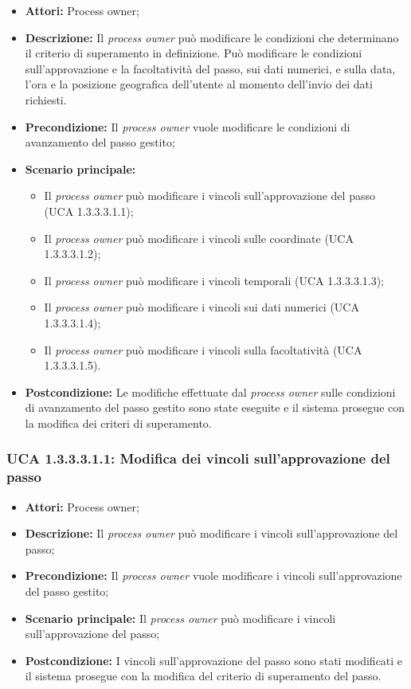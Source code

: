 \begin{itemize}
\item \textbf{Attori:} Process owner;
\item \textbf{Descrizione:}
Il \textit{process owner} può modificare le condizioni che determinano il criterio di superamento in definizione.
Può modificare le condizioni sull'approvazione e la facoltatività del passo, sui dati numerici, e sulla data, l'ora e la posizione geografica dell'utente al momento dell'invio dei dati richiesti.
\item \textbf{Precondizione:}
Il \textit{process owner} vuole modificare le condizioni di avanzamento del passo gestito;
\item \textbf{Scenario principale:}
\begin{itemize}
\item Il \textit{process owner} può modificare i vincoli sull'approvazione del passo (UCA 1.3.3.3.1.1);
\item Il \textit{process owner} può modificare i vincoli sulle coordinate (UCA 1.3.3.3.1.2);
\item Il \textit{process owner} può modificare i vincoli temporali (UCA 1.3.3.3.1.3);
\item Il \textit{process owner} può modificare i vincoli sui dati numerici (UCA 1.3.3.3.1.4);
\item Il \textit{process owner} può modificare i vincoli sulla facoltatività (UCA 1.3.3.3.1.5).
\end{itemize}
\item \textbf{Postcondizione:}
Le modifiche effettuate dal \textit{process owner} sulle condizioni di avanzamento del passo gestito sono state eseguite e il sistema prosegue con la modifica dei criteri di superamento.
\end{itemize}

\hypertarget{A1.3.3.3.1.1}{}
\subsubsection{UCA 1.3.3.3.1.1: Modifica dei vincoli sull'approvazione del passo}
\begin{itemize}
\item \textbf{Attori:} Process owner;
\item \textbf{Descrizione:}
Il \textit{process owner} può modificare i vincoli sull'approvazione del passo;
\item \textbf{Precondizione:}
Il \textit{process owner} vuole modificare i vincoli sull'approvazione del passo gestito;
\item \textbf{Scenario principale:}
Il \textit{process owner} può modificare i vincoli sull'approvazione del passo;
\item \textbf{Postcondizione:}
I vincoli sull'approvazione del passo sono stati modificati e il sistema prosegue con la modifica del criterio di superamento del passo.
\end{itemize}

